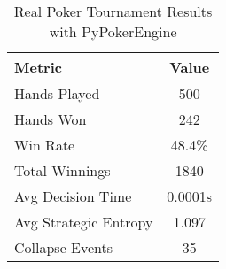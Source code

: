 \begin{table}[h]
\centering
\caption{Real Poker Tournament Results with PyPokerEngine}
\begin{tabular}{|l|c|}
\hline
Metric & Value \\
\hline
Hands Played & 500 \\
Hands Won & 242 \\
Win Rate & 48.4\% \\
Total Winnings & 1840 \\
Avg Decision Time & 0.0001s \\
Avg Strategic Entropy & 1.097 \\
Collapse Events & 35 \\
\hline
\end{tabular}
\end{table}
